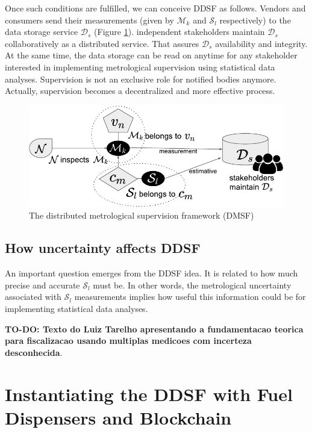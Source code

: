 \documentclass[sigplan]{acmart}
\begin{document}
Once such conditions are fulfilled, we can conceive DDSF as follows.
Vendors and consumers send their measurements (given by $\mathcal{M}_k$ and $\mathcal{S}_l$ respectively) to the data storage service $\mathcal{D}_s$ (Figure \ref{f:basicframe2}).
independent stakeholders maintain $\mathcal{D}_s$ collaboratively as a distributed service.
That assures $\mathcal{D}_s$ availability and integrity.
At the same time, the data storage can be read on anytime for any stakeholder interested in implementing metrological supervision using statistical data analyses.
Supervision is not an exclusive role for notified bodies anymore.
Actually, supervision becomes a decentralized and more effective process.

\begin{figure}[!t]
\centering
\includegraphics[width=.4\textwidth]{basicframe2}
\caption{The distributed metrological supervision framework (DMSF)}
\label{f:basicframe2}
\end{figure}

\subsection{How uncertainty affects DDSF}
An important question emerges from the DDSF idea.
It is related to how much precise and accurate $\mathcal{S}_l$ must be.
In other words, the metrological uncertainty associated with $\mathcal{S}_l$ measurements implies how useful this information could be for implementing statistical data analyses.

\textbf{TO-DO: Texto do Luiz Tarelho apresentando a fundamentacao teorica para fiscalizacao usando multiplas medicoes com incerteza desconhecida}.


\section{Instantiating the DDSF with Fuel Dispensers and Blockchain}
\end{document}

